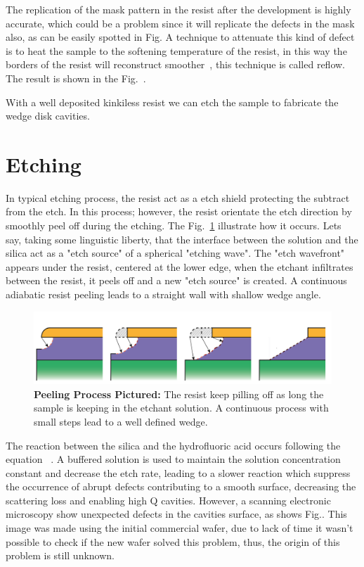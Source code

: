 The replication of the mask pattern in the resist after the development is highly accurate, which could be a problem since it will replicate the defects in the mask also, as can be easily spotted in Fig. A technique to attenuate this kind of defect is to heat the sample to the softening temperature of the resist, in this way the borders of the resist will reconstruct smoother~\needcit, this technique is called reflow. The result is shown in the Fig.~.

With a well deposited kinkiless resist we can etch the sample to fabricate the wedge disk cavities. 

\section{Etching}

In typical etching process, the resist act as a etch shield protecting the subtract from the etch. In this process; however, the resist orientate the etch direction by smoothly peel off during the etching. The Fig.~\ref{fig:wedeg_grow} illustrate how it occurs. Lets say, taking some linguistic liberty, that the interface between the solution and the silica act as a "etch source" of a spherical "etching wave". The "etch wavefront" appears under the resist, centered at the lower edge, when the etchant infiltrates between the resist, it peels off and a new "etch source" is created. A continuous adiabatic resist peeling leads to a straight wall with shallow wedge angle. %

\begin{figure}[!ht]
    \centering
    \includegraphics[width = 16cm]{figuras/Dissertation_etching.jpg}
    \caption{\textbf{Peeling Process Pictured:} The resist keep pilling off as long the sample is keeping in the etchant solution. A continuous process with small steps lead to a well defined wedge.}
    \label{fig:wedeg_grow}
\end{figure}

The reaction between the silica and the hydrofluoric acid occurs following the equation~\cite{Kang_2002} 
.
A buffered solution is used to maintain the solution concentration constant and decrease the etch rate, leading to a slower reaction which suppress the occurrence of abrupt defects contributing to a smooth surface, decreasing the scattering loss and enabling high Q cavities. However, a scanning electronic microscopy show unexpected defects in the cavities surface, as shows Fig.. This image was made using the initial commercial wafer, due to lack of time it wasn't possible to check if the new wafer solved this problem, thus, the origin of this problem is still unknown. 

